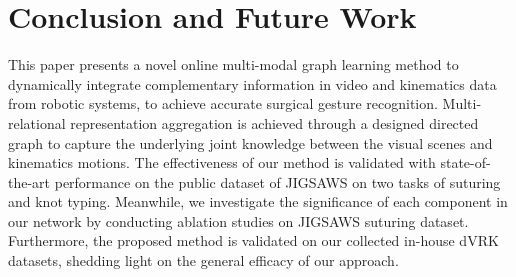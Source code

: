 \documentclass[letterpaper, 10 pt, conference]{ieeeconf}
\begin{document}
\begin{table}[t]
\begin{center}
\caption{Results of different methods on Peg Transfer dataset in site JHU for gesture recognition.}\label{tab_peg_jhu}
\end{center}
\vspace{-7mm}
\end{table}

\section{Conclusion and Future Work}
\label{CONCLUSIONS}	
This paper presents a novel online multi-modal graph learning method to dynamically integrate complementary information in video and kinematics data from robotic systems, to achieve accurate surgical gesture recognition. Multi-relational representation aggregation is achieved through a designed directed graph to capture the underlying
joint knowledge
between the visual scenes and kinematics motions.
The effectiveness of our method is validated with state-of-the-art performance on the public dataset of JIGSAWS on two tasks of suturing and knot typing. Meanwhile, we investigate the significance of each component in our network by conducting ablation studies on JIGSAWS suturing dataset.
Furthermore, the proposed method is validated on our collected in-house dVRK datasets, shedding light on the general efficacy of our approach.
\end{document}
